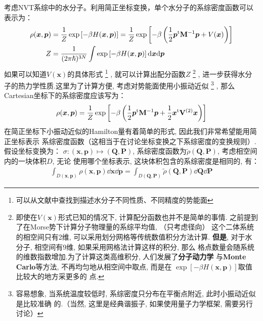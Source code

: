     考虑NVT系综中的水分子。利用简正坐标变换，单个水分子的系综密度函数可以表示为：
    \begin{equation}
        \begin{split}
            \rho(\bm{x}, \bm{p}) &= \frac{1}{Z}\exp\left[-\beta H(\bm{x}, \bm{p})\right]
            = \frac{1}{Z}\exp\left[-\beta\left(\frac{1}{2}\bm{p}^{\mathrm{t}}\mathbf{M}^{-1}\bm{p} + V(\bm{x})\right)\right]\\
            Z &= \frac{1}{(2\pi\hslash)^{3N}}\int\exp\left[-\beta H(\bm{x}, \bm{p})\right]\mathrm{d} \bm{x}\mathrm{d} \bm{p}
        \end{split}
    \end{equation}
    如果可以知道$V(\bm{x})$的具体形式
    \footnote{可以从文献中查找到描述水分子不同性质、不同精度的势能面}
    , 就可以计算出配分函数$Z$
    \footnote{即使在$V(\bm{x})$形式已知的情况下, 计算配分函数也并不是简单的事情.
    之前提到了在Morse势下计算分子物理量的系综平均值, （只考虑径向）
    这个二体系统的相空间只有2维, 可以采用划分网格等传统数值积分方法计算.
    \textbf{但是}, 对于水分子, 相空间有9维, 如果采用网格法计算这样的积分, 那么
    格点数量会随系统的维数指数增加.为了计算这类高维积分, 人们发展了\textbf{分子动力学}
    与\textbf{Monte Carlo}等方法, 不再均匀地从相空间中取点, 而是在
    $\exp\left[-\beta H(\bm{x}, \bm{p})\right]$取值比较大的地方采更多的
    点.}
    , 进一步获得水分子的热力学性质.这里为了计算方便, 考虑对势能面使用小振动近似
    \footnote{
        容易想象, 当系统温度较低时, 系综密度只分布在平衡点附近, 此时小振动近似是比较准确
        的.（当然, 这里是经典谐振子, 如果使用量子力学框架, 需要另行讨论）
    }
    , 那么Cartesian坐标下的系综密度应该写为：
    \begin{equation}
        \begin{split}
            \rho(\bm{x}, \bm{p}) = \frac{1}{Z}\exp\left[-\beta\left(
                \frac{1}{2}\bm{p}^{\mathrm{t}}\mathbf{M}^{-1}\bm{p} + \frac{1}{2}\bm{x}^{\mathrm{t}}
                \mathbf{V}^{(2)}\bm{x}
            \right)\right]
        \end{split}
    \end{equation}
    在简正坐标下小振动近似的Hamilton量有着简单的形式, 因此我们非常希望能用简正坐标表示
    系综密度函数（这相当于在讨论坐标变换之下系综密度的变换规则）.假设坐标变换为：
    $\sigma: (\bm{x}, \bm{p})\mapsto(\bm{Q}, \bm{P})$, 
    系综密度函数为$\tilde{\rho}(\bm{Q}, \bm{P})$, 考虑相空间内的一块体积$D$, 无论
    使用哪个坐标表示, 这块体积包含的系综密度是相同的, 有：
    \begin{equation}
        \begin{split}
            \int_{D(\bm{x},\bm{p})}\rho(\bm{x}, \bm{p})\dd \bm{x}\dd \bm{p}
             = \int_{D(\bm{Q}, \bm{P})}\tilde{\rho}(\bm{Q}, \bm{P})\dd \bm{Q}\dd \bm{P}
        \end{split}
    \end{equation}
